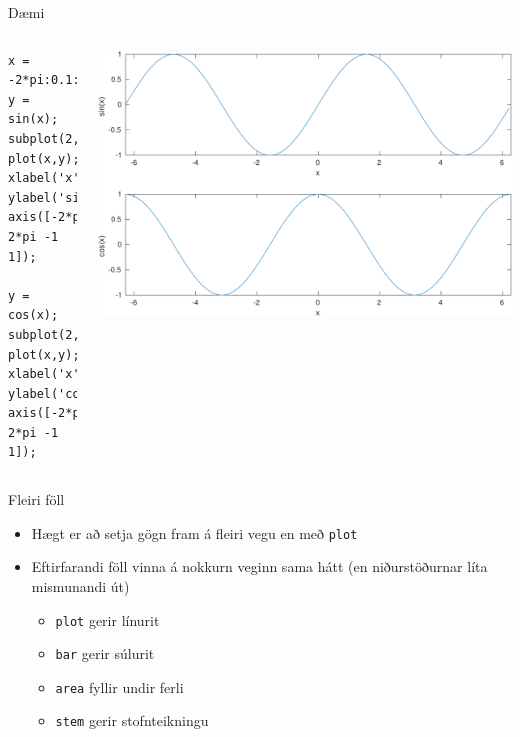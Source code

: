\documentclass{beamer}
\begin{document}
\begin{frame}[fragile]{Dæmi}
\begin{columns}
\begin{verbatim}
x = -2*pi:0.1:2*pi;
y = sin(x);
subplot(2,1,1);
plot(x,y);
xlabel('x');
ylabel('sin(x)');
axis([-2*pi 2*pi -1 1]);

y = cos(x);
subplot(2,1,2);
plot(x,y);
xlabel('x');
ylabel('cos(x)');
axis([-2*pi 2*pi -1 1]);
\end{verbatim}
\includegraphics[width=\textwidth]{Pics/subplot-example.pdf}
\end{columns}
\end{frame}

\begin{frame}{Fleiri föll}
\begin{itemize}
 \item Hægt er að setja gögn fram á fleiri vegu en með \texttt{plot}
 \item Eftirfarandi föll vinna á nokkurn veginn sama hátt (en niðurstöðurnar líta mismunandi út)
 \begin{itemize}
  \item \texttt{plot} gerir línurit
  \item \texttt{bar} gerir súlurit
  \item \texttt{area} fyllir undir ferli
  \item \texttt{stem} gerir stofnteikningu
 \end{itemize}
\end{itemize}
\end{frame}
\end{document}
